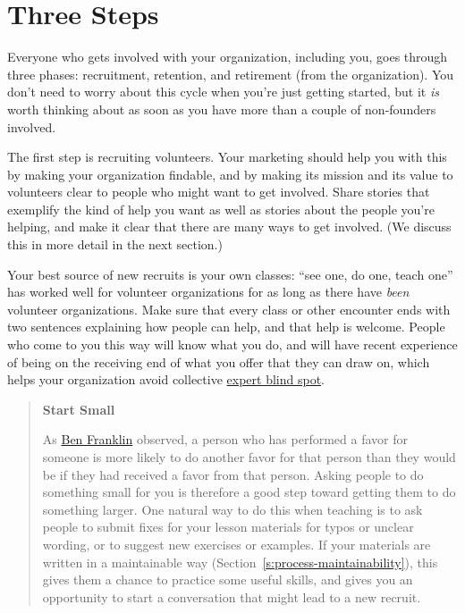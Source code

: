 \section{Three Steps}\label{s:community-three-steps}

Everyone who gets involved with your organization, including you, goes
through three phases: recruitment, retention, and retirement (from the
organization). You don't need to worry about this cycle when you're just
getting started, but it \emph{is} worth thinking about as soon as you have
more than a couple of non-founders involved.

The first step is recruiting volunteers. Your marketing should help you
with this by making your organization findable, and by making its
mission and its value to volunteers clear to people who might want to
get involved. Share stories that exemplify the kind of help you want as
well as stories about the people you're helping, and make it clear that
there are many ways to get involved. (We discuss this in more detail in
the next section.)

Your best source of new recruits is your own classes: ``see one, do one,
teach one'' has worked well for volunteer organizations for as long as
there have \emph{been} volunteer organizations. Make sure that every class or
other encounter ends with two sentences explaining how people can help,
and that help is welcome. People who come to you this way will know what
you do, and will have recent experience of being on the receiving end of
what you offer that they can draw on, which helps your organization
avoid collective \protect\hyperlink{g:expert-blind-spot}{expert blind spot}.

\begin{quote}\setlength{\parindent}{0pt}
\textbf{Start Small}

As \href{https://en.wikipedia.org/wiki/Ben\_Franklin\_effect}{Ben Franklin} observed, a person who has
performed a favor for someone is more likely to do another favor for
that person than they would be if they had received a favor from
that person. Asking people to do something small for you is
therefore a good step toward getting them to do something
larger. One natural way to do this when teaching is to ask people to
submit fixes for your lesson materials for typos or unclear wording,
or to suggest new exercises or examples. If your materials are
written in a maintainable way
(Section~\ref{s:process-maintainability}), this gives them a chance to
practice some useful skills, and gives you an opportunity to start a
conversation that might lead to a new recruit.
\end{quote}

